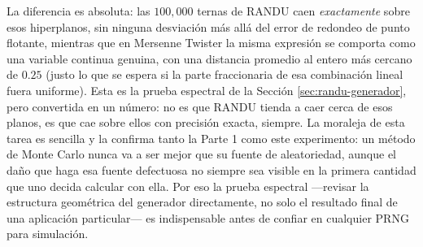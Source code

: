 \documentclass[11pt]{article}
\begin{document}
La diferencia es absoluta: las $100{,}000$ ternas de RANDU caen \emph{exactamente} sobre esos hiperplanos, sin ninguna desviación más allá del error de redondeo de punto flotante, mientras que en Mersenne Twister la misma expresión se comporta como una variable continua genuina, con una distancia promedio al entero más cercano de $0.25$ (justo lo que se espera si la parte fraccionaria de esa combinación lineal fuera uniforme). Esta es la prueba espectral de la Sección \ref{sec:randu-generador}, pero convertida en un número: no es que RANDU tienda a caer cerca de esos planos, es que cae sobre ellos con precisión exacta, siempre. La moraleja de esta tarea es sencilla y la confirma tanto la Parte 1 como este experimento: un método de Monte Carlo nunca va a ser mejor que su fuente de aleatoriedad, aunque el daño que haga esa fuente defectuosa no siempre sea visible en la primera cantidad que uno decida calcular con ella. Por eso la prueba espectral —revisar la estructura geométrica del generador directamente, no solo el resultado final de una aplicación particular— es indispensable antes de confiar en cualquier PRNG para simulación.
\end{document}
